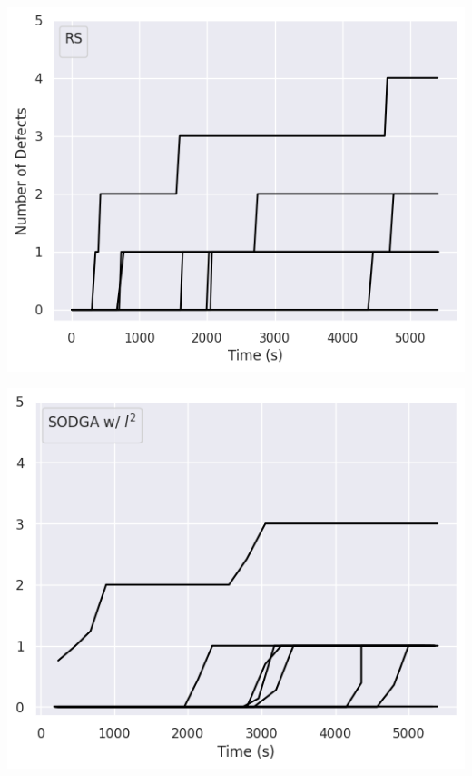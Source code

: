 \begin{minipage}{\textwidth}
\vspace{0.25cm}
  \begin{minipage}[b]{0.3\textwidth}
    \centering
    \includegraphics[scale=0.4]{img/rq2/rq2-conv1.png}
    \label{fig:rq2conv1}
  \end{minipage}
  \hfill
  \begin{minipage}[b]{0.3\textwidth}
    \centering
    \includegraphics[scale=0.4]{img/rq2/rq2-conv2.png}

\end{minipage}
\end{minipage}
